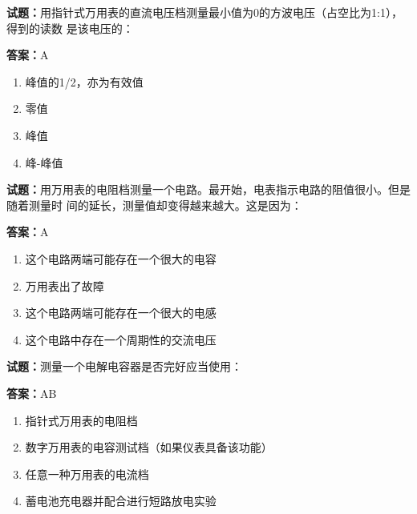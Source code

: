 \documentclass{ctexbook}
\begin{document}




\vspace{1em}

\textbf{试题：}用指针式万用表的直流电压档测量最小值为0的方波电压（占空比为1:1），得到的读数
是该电压的： 

\textbf{答案：}A 

\begin{enumerate}[leftmargin=3em]
  \item 峰值的1/2，亦为有效值 

  \item 零值 

  \item 峰值 

  \item 峰-峰值 

\end{enumerate}





\vspace{1em}

\textbf{试题：}用万用表的电阻档测量一个电路。最开始，电表指示电路的阻值很小。但是随着测量时
间的延长，测量值却变得越来越大。这是因为： 

\textbf{答案：}A 

\begin{enumerate}[leftmargin=3em]
  \item 这个电路两端可能存在一个很大的电容 

  \item 万用表出了故障 

  \item 这个电路两端可能存在一个很大的电感 

  \item 这个电路中存在一个周期性的交流电压 

\end{enumerate}





\vspace{1em}

\textbf{试题：}测量一个电解电容器是否完好应当使用： 

\textbf{答案：}AB 

\begin{enumerate}[leftmargin=3em]
  \item 指针式万用表的电阻档 

  \item 数字万用表的电容测试档（如果仪表具备该功能） 

  \item 任意一种万用表的电流档 

  \item 蓄电池充电器并配合进行短路放电实验 

\end{enumerate}
\end{document}
